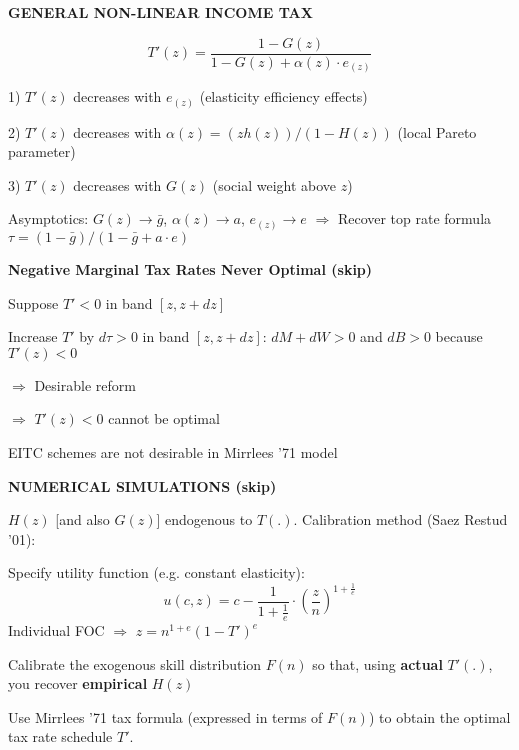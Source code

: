 \documentclass[landscape]{slides}
\begin{document}
\begin{slide}
\begin{center}
{\bf GENERAL NON-LINEAR INCOME TAX}
\end{center}
\[ T'(z) =\frac{1-G(z)}{1-G(z) + \alpha(z) \cdot e_{(z)} } \]

1) $T'(z)$ decreases with $e_{(z)}$ (elasticity efficiency
effects)

2) $T'(z)$ decreases with $ \alpha(z)= (z h(z))/(1-H(z))$ (local Pareto
parameter)

3) $T'(z) $ decreases with  $G(z)$ (social weight above $z$)

Asymptotics: $G(z) \rightarrow \bar{g}$, $\alpha(z)
\rightarrow a$, $e_{(z)} \rightarrow
e$ $\Rightarrow$ Recover top rate formula
$\tau=(1-\bar{g})/(1-\bar{g}+a \cdot e)$
\end{slide}

\begin{slide}

\end{slide}

\begin{slide}
\begin{center}
{\bf Negative Marginal Tax Rates Never Optimal (skip)}
\end{center}
Suppose $T'<0$ in band $[z,z+dz]$

Increase $T'$ by $d\tau>0$ in band $[z,z+dz]$: $dM+dW>0$ and
$dB>0$ because $T'(z)<0$

$\Rightarrow$ Desirable reform

$\Rightarrow$  $T'(z)<0$ cannot be optimal

EITC schemes are not desirable in Mirrlees '71 model 
\end{slide}


\begin{slide}
\begin{center}
{\bf NUMERICAL SIMULATIONS (skip)}
\end{center}
$H(z)$ [and also $G(z)$] endogenous to $T(.)$. Calibration method
(Saez Restud '01):

Specify utility function (e.g. constant elasticity):
$$u(c,z)=c- \frac{1}{1+\frac{1}{e}} \cdot  \left ( \frac{z}{n} \right )
^{1+\frac{1}{e}}$$ Individual FOC $\Rightarrow$
$z=n^{1+e} (1-T')^{e}$

Calibrate the exogenous skill distribution $F(n)$ so that, using
{\bf actual} $T'(.)$, you recover {\bf empirical} $H(z)$

Use Mirrlees '71 tax formula (expressed in terms of $F(n)$) to
obtain the optimal tax rate schedule $T'$.

\end{slide}
\end{document}
